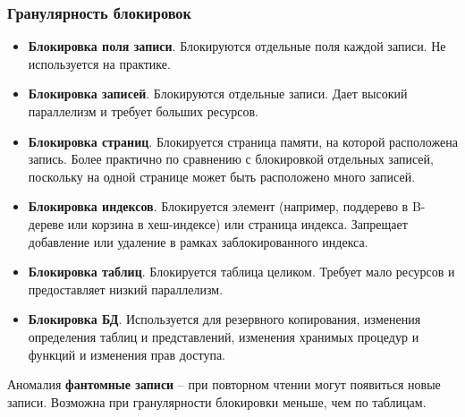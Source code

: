 \subsubsection{Гранулярность блокировок}

\begin{itemize}
    \item \textbf{Блокировка поля записи}. Блокируются отдельные поля каждой записи. Не
        используется на практике.
    \item \textbf{Блокировка записей}. Блокируются отдельные записи. Дает высокий параллелизм и
        требует больших ресурсов.
    \item \textbf{Блокировка страниц}. Блокируется страница памяти, на которой расположена запись.
        Более практично по сравнению с блокировкой отдельных записей, поскольку на одной странице
        может быть расположено много записей.
    \item \textbf{Блокировка индексов}. Блокируется элемент (например, поддерево в B-дереве или
        корзина в хеш-индексе) или страница индекса. Запрещает добавление или удаление в рамках
          заблокированного индекса.
    \item \textbf{Блокировка таблиц}. Блокируется таблица целиком. Требует мало ресурсов и
        предоставляет низкий параллелизм.
    \item \textbf{Блокировка БД}. Используется для резервного копирования, изменения определения
        таблиц и представлений, изменения хранимых процедур и функций и изменения прав доступа.
\end{itemize}

Аномалия \textbf{фантомные записи} -- при повторном чтении могут появиться новые записи. Возможна
при гранулярности блокировки меньше, чем по таблицам.

